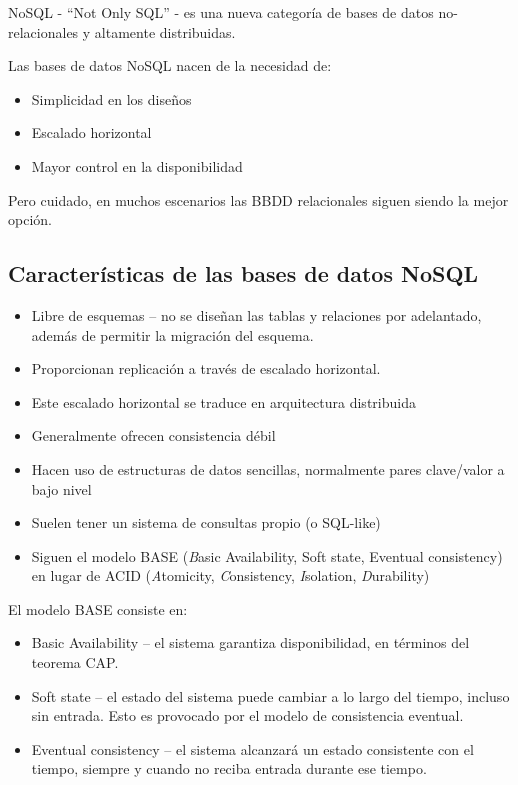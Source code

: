 \documentclass[]{book}
\providecommand{\tightlist}{%
  \setlength{\itemsep}{0pt}\setlength{\parskip}{0pt}}
\begin{document}
NoSQL - ``Not Only SQL'' - es una nueva categoría de bases de datos no-relacionales y altamente distribuidas.

Las bases de datos NoSQL nacen de la necesidad de:

\begin{itemize}
\item
  Simplicidad en los diseños
\item
  Escalado horizontal
\item
  Mayor control en la disponibilidad
\end{itemize}

Pero cuidado, en muchos escenarios las BBDD relacionales siguen siendo la mejor opción.

\hypertarget{caracteristicas-de-las-bases-de-datos-nosql}{%
\subsection{Características de las bases de datos NoSQL}\label{caracteristicas-de-las-bases-de-datos-nosql}}

\begin{itemize}
\tightlist
\item
  Libre de esquemas -- no se diseñan las tablas y relaciones por adelantado, además de permitir la migración del esquema.
\item
  Proporcionan replicación a través de escalado horizontal.
\item
  Este escalado horizontal se traduce en arquitectura distribuida
\item
  Generalmente ofrecen consistencia débil
\item
  Hacen uso de estructuras de datos sencillas, normalmente pares clave/valor a bajo nivel
\item
  Suelen tener un sistema de consultas propio (o SQL-like)
\item
  Siguen el modelo BASE (\emph{B}asic Availability, Soft state, Eventual consistency) en lugar de ACID (\emph{A}tomicity, \emph{C}onsistency, \emph{I}solation, \emph{D}urability)
\end{itemize}

El modelo BASE consiste en:

\begin{itemize}
\tightlist
\item
  Basic Availability -- el sistema garantiza disponibilidad, en términos del teorema CAP.
\item
  Soft state -- el estado del sistema puede cambiar a lo largo del tiempo, incluso sin entrada. Esto es provocado por el modelo de consistencia eventual.
\item
  Eventual consistency -- el sistema alcanzará un estado consistente con el tiempo, siempre y cuando no reciba entrada durante ese tiempo.
\end{itemize}
\end{document}
